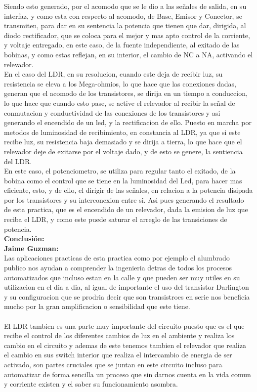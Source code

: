 \documentclass[12pt,a4paper]{article}
\begin{document}
Siendo esto generado, por el acomodo que se le dio a las señales de salida, en su interfaz, y como esta con respecto al acomodo, de Base, Emisor y Conector, se transmiten, para dar en su sentencia la potencia que tienen que dar, dirigida, al diodo rectificador, que se coloca para el mejor y mas apto control de la corriente, y voltaje entregado, en este caso, de la fuente independiente, al exitado de las bobinas, y como estas reflejan, en su interior, el cambio de NC a NA, activando el relevador.\\


En el caso del LDR, en su resolucion, cuando este deja de recibir luz, su resistencia se eleva a los Mega-ohmios, lo que hace que las conexiones dadas, generan que el acomodo de los transistores, se dirija en un tiempo a conduccion, lo que hace que cuando esto pase, se active el relevador al recibir la señal de conmutacion y conductividad de las conexiones de los transistores y asi generando el encendido de un led, y la rectificacion de ello. Puesto en marcha por metodos de luminosidad de recibimiento, en constancia al LDR, ya que si este recibe luz, su resistencia baja demasiado y se dirija a tierra, lo que hace que el relevador deje de exitarse por el voltaje dado, y de esto se genere, la sentiencia del LDR.\\

En este caso, el potenciometro, se utiliza para regular tanto el exitado, de la bobina como el control que se tiene en la luminosidad del Led, para hacer mas eficiente, esto, y de ello, el dirigir de las señales, en relacion a la potencia disipada por los transistores y su interconexion entre si. Asi pues generando el resultado de esta practica, que es el encendido de un relevador, dada la emision de luz que reciba el LDR, y como este puede saturar el arreglo de las transiciones de potencia.\\

\textbf{\Large Conclusión:}\\

\textbf{Jaime Guzman:}\\
Las aplicaciones practicas de esta practica como por ejemplo el alumbrado publico nos ayudan a comprender la ingenieria detras de todos los procesos automatizados que incluso estan en la calle y que pueden ser muy utiles en su utilizacion en el dia a dia, al igual de importante el uso del transistor Darlington y su configuracion que  se prodria decir que son transistroes en serie nos beneficia mucho por la gran amplificacion o sensibilidad que este tiene.\\\\
El LDR tambien es una parte muy importante del circuito puesto que es el que recibe el control de los diferentes  cambios de luz en el ambiente y realiza los cambio en el circuito y ademas de este tenemos tambien el relevador que realiza el cambio en sus switch interior que realiza el intercambio de energia de ser activado, son partes cruciales que se juntan en este circuito incluso para automatizar de forma sencilla un proceso que sin darnos cuenta en la vida comun y corriente existen y el saber su funcionamiento asombra.\\
\end{document}
